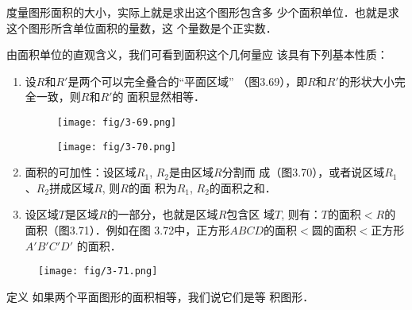 度量图形面积的大小，实际上就是求出这个图形包含多
少个面积单位．也就是求这个图形所含单位面积的量数，这
个量数是个正实数．

由面积单位的直观含义，我们可看到面积这个几何量应
该具有下列基本性质：
\begin{enumerate}
\item 设$R$和$R'$是两个可以完全叠合的“平面区域”
（图3.69），即$R$和$R'$的形状大小完全一致，则$R$和$R'$的
面积显然相等．
\begin{figure}[htp]
    \centering
\texttt{[image: fig/3-69.png]}
    \caption{}
\end{figure}
\begin{figure}[htp]
    \centering
\texttt{[image: fig/3-70.png]}
    \caption{}
\end{figure}
\item 面积的可加性：设区域$R_1$, $R_2$是由区域$R$分割而
成（图3.70），或者说区域$R_1$、$R_2$拼成区域$R$, 则$R$的面
积为$R_1$, $R_2$的面积之和．
\item 设区域$T$是区域$R$的一部分，也就是区域$R$包含区
域$T$, 则有：$T$的面积$<R$的面积（图3.71）．例如在图
3.72中，正方形$ABCD$的面积$<$圆的面积$<$正方形$A'B'C'D'$
的面积．
\end{enumerate}

\begin{figure}[htp]\centering
    \begin{minipage}[t]{0.48\textwidth}
    \centering
    \texttt{[image: fig/3-71.png]}
    \caption{}
    \end{minipage}
    \begin{minipage}[t]{0.48\textwidth}
    \centering
    \caption{}
    \end{minipage}
    \end{figure}


\begin{blk}{定义}
如果两个平面图形的面积相等，我们说它们是等
积图形．  
\end{blk}

